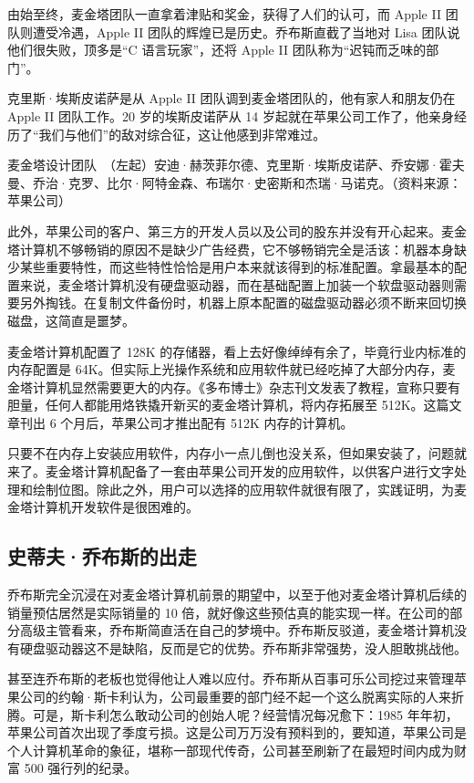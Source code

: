 \documentclass[12pt,UTF8]{ctexbook}
\begin{document}
由始至终，麦金塔团队一直拿着津贴和奖金，获得了人们的认可，而 Apple II 团队则遭受冷遇，Apple II 团队的辉煌已是历史。乔布斯直截了当地对 Lisa 团队说他们很失败，顶多是“C 语言玩家”，还将 Apple II 团队称为“迟钝而乏味的部门”。

克里斯·埃斯皮诺萨是从 Apple II 团队调到麦金塔团队的，他有家人和朋友仍在 Apple II 团队工作。20 岁的埃斯皮诺萨从 14 岁起就在苹果公司工作了，他亲身经历了“我们与他们”的敌对综合征，这让他感到非常难过。



麦金塔设计团队　（左起）安迪·赫茨菲尔德、克里斯·埃斯皮诺萨、乔安娜·霍夫曼、乔治·克罗、比尔·阿特金森、布瑞尔·史密斯和杰瑞·马诺克。（资料来源：苹果公司）

此外，苹果公司的客户、第三方的开发人员以及公司的股东并没有开心起来。麦金塔计算机不够畅销的原因不是缺少广告经费，它不够畅销完全是活该：机器本身缺少某些重要特性，而这些特性恰恰是用户本来就该得到的标准配置。拿最基本的配置来说，麦金塔计算机没有硬盘驱动器，而在基础配置上加装一个软盘驱动器则需要另外掏钱。在复制文件备份时，机器上原本配置的磁盘驱动器必须不断来回切换磁盘，这简直是噩梦。

麦金塔计算机配置了 128K 的存储器，看上去好像绰绰有余了，毕竟行业内标准的内存配置是 64K。但实际上光操作系统和应用软件就已经吃掉了大部分内存，麦金塔计算机显然需要更大的内存。《多布博士》杂志刊文发表了教程，宣称只要有胆量，任何人都能用烙铁撬开新买的麦金塔计算机，将内存拓展至 512K。这篇文章刊出 6 个月后，苹果公司才推出配有 512K 内存的计算机。

只要不在内存上安装应用软件，内存小一点儿倒也没关系，但如果安装了，问题就来了。麦金塔计算机配备了一套由苹果公司开发的应用软件，以供客户进行文字处理和绘制位图。除此之外，用户可以选择的应用软件就很有限了，实践证明，为麦金塔计算机开发软件是很困难的。





\subsection{史蒂夫·乔布斯的出走}


乔布斯完全沉浸在对麦金塔计算机前景的期望中，以至于他对麦金塔计算机后续的销量预估居然是实际销量的 10 倍，就好像这些预估真的能实现一样。在公司的部分高级主管看来，乔布斯简直活在自己的梦境中。乔布斯反驳道，麦金塔计算机没有硬盘驱动器这不是缺陷，反而是它的优势。乔布斯非常强势，没人胆敢挑战他。

甚至连乔布斯的老板也觉得他让人难以应付。乔布斯从百事可乐公司挖过来管理苹果公司的约翰·斯卡利认为，公司最重要的部门经不起一个这么脱离实际的人来折腾。可是，斯卡利怎么敢动公司的创始人呢？经营情况每况愈下：1985 年年初，苹果公司首次出现了季度亏损。这是公司万万没有预料到的，要知道，苹果公司是个人计算机革命的象征，堪称一部现代传奇，公司甚至刷新了在最短时间内成为财富 500 强行列的纪录。
\end{document}
